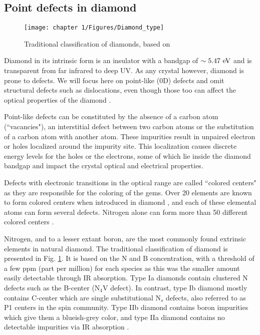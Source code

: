 \documentclass[a4paper,11pt]{report}
\begin{document}
\begin{refsection}
\subsection{Point defects in diamond}
\begin{figure}[h!]
\centering
\texttt{[image: chapter 1/Figures/Diamond\_type]}
\caption{Traditional classification of diamonds, based on \citep{tappert2011diamonds}}
\label{diamond type}
\end{figure}
Diamond in its intrinsic form is an insulator with a bandgap of $\sim 5.47\ \rm eV$ and is transparent from far infrared to deep UV. As any crystal however, diamond is prone to defects. We will focus here on point-like (0D) defects and omit structural defects such as dislocations, even though those too can affect the optical properties of the diamond \citep{collins2000colour}. 

Point-like defects can be constituted by the absence of a carbon atom (``vacancies"), an interstitial defect between two carbon atoms or the substitution of a carbon atom with another atom. These impurities result in unpaired electron or holes localized around the impurity site. This localization causes discrete energy levels for the holes or the electrons, some of which lie inside the diamond bandgap and impact the crystal optical and electrical properties. 

Defects with electronic transitions in the optical range are called ``colored centers" as they are responsible for the coloring of the gems.  Over 20 elements are known to form colored centers when introduced in diamond \citep{zaitsev2013optical, shenderova2019synthesis}, and each of these elemental atoms can form several defects. Nitrogen alone can form more than 50 different colored centers \citep{dobrinets2016hpht, ashfold2020nitrogen}.

Nitrogen, and to a lesser extant boron, are the most commonly found extrinsic elements in natural diamond. The traditional classification of diamond is presented in Fig. \ref{diamond type}. It is based on the N and B concentration, with a threshold of a few ppm (part per million) for each species as this was the smaller amount easily detectable through IR absorption. Type Ia diamonds contain clustered N defects such as the B-center (N$_4$V defect). In contrast, type Ib diamond mostly contains C-center which are single substitutional N$_s$ defects, also referred to as P1 centers in the spin community. Type IIb diamond contains boron impurities which give them a blueish-grey color, and type IIa diamond contains no detectable impurities via IR absorption \citep{ashfold2020nitrogen}.


\end{refsection}
\end{document}
